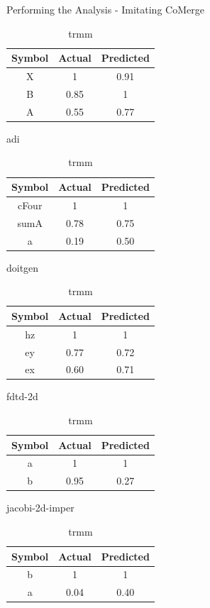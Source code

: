 \documentclass[final]{beamer}
\begin{document}
\begin{frame}{\hspace{0.02\paperwidth}Performing the Analysis - Imitating CoMerge}
\begin{table}[hbt!]
\begin{center}
\begin{subtable}{.45\linewidth}
\begin{tabular}{|c|c|c|}
\hline
Symbol & Actual & Predicted \\
\hline\hline
X & 1 & 0.91 \\
\hline
B & 0.85 & 1 \\
\hline
A & 0.55 & 0.77 \\
\hline
\end{tabular}
\caption{adi}
\end{subtable}
\begin{subtable}{.45\linewidth}
\begin{tabular}{|c|c|c|}
\hline
Symbol & Actual & Predicted \\
\hline\hline
cFour & 1 & 1 \\
\hline
sumA & 0.78 & 0.75 \\
\hline
a & 0.19 & 0.50 \\
\hline
\end{tabular}
\caption{doitgen}
\end{subtable}
\begin{subtable}{.45\linewidth}
\begin{tabular}{|c|c|c|}
\hline
Symbol & Actual & Predicted \\
\hline\hline
hz & 1 & 1 \\
\hline
ey & 0.77 & 0.72 \\
\hline
ex & 0.60 & 0.71 \\
\hline
\end{tabular}
\caption{fdtd-2d}
\end{subtable}
\begin{subtable}{.45\linewidth}
\begin{tabular}{|c|c|c|}
\hline
Symbol & Actual & Predicted \\
\hline\hline
a & 1 & 1 \\
\hline
b & 0.95 & 0.27 \\
\hline
\end{tabular}
\caption{jacobi-2d-imper}
\end{subtable}
\begin{subtable}{.45\linewidth}
\begin{tabular}{|c|c|c|}
\hline
Symbol & Actual & Predicted \\
\hline\hline
b & 1 & 1 \\
\hline
a & 0.04 & 0.40 \\
\hline
\end{tabular}
\caption{trmm}
\end{subtable}
\label{tbl:results}
\end{center}
\end{table}
\end{frame}
\end{document}
